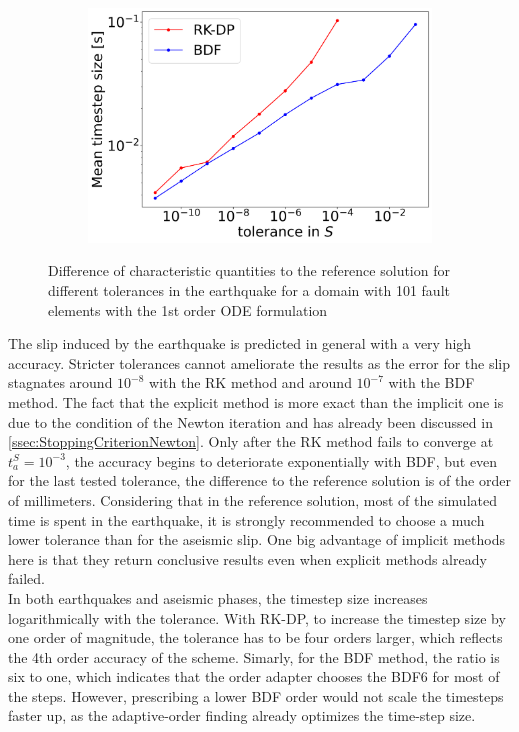 \begin{figure}[H]
\begin{subfigure}[t]{0.32\textwidth}
		\includegraphics[width=1\textwidth]{images/TANDEMcompactODEDifferentTolerancesSize101_EQ_DT.png}
	\end{subfigure}
	\caption{Difference of characteristic quantities to the reference solution for different tolerances in the earthquake for a domain with 101 fault elements with the 1st order ODE formulation}
	\label{fig:tolerancesEarthquake_compactODE}
\end{figure}
The slip induced by the earthquake is predicted in general with a very high accuracy. Stricter tolerances cannot ameliorate the results as the error for the slip stagnates around $10^{-8}$ with the RK method and around $10^{-7}$ with the BDF method. The fact that the explicit method is more exact than the implicit one is due to the condition of the Newton iteration and has already been discussed in \autoref{ssec:StoppingCriterionNewton}. Only after the RK method fails to converge at $t_a^S = 10^{-3}$, the accuracy begins to deteriorate exponentially with BDF, but even for the last tested tolerance, the difference to the reference solution is of the order of millimeters. Considering that in the reference solution, most of the simulated time is spent in the earthquake, it is strongly recommended to choose a much lower tolerance than for the aseismic slip. One big advantage of implicit methods here is that they return conclusive results even when explicit methods already failed. \\

In both earthquakes and aseismic phases, the timestep size increases logarithmically with the tolerance. With RK-DP, to increase the timestep size by one order of magnitude, the tolerance has to be four orders larger, which reflects the 4th order accuracy of the scheme. Simarly, for the BDF method, the ratio is six to one, which indicates that the order adapter chooses the BDF6 for most of the steps. However, prescribing a lower BDF order would not scale the timesteps faster up, as the adaptive-order finding already optimizes the time-step size. \\

